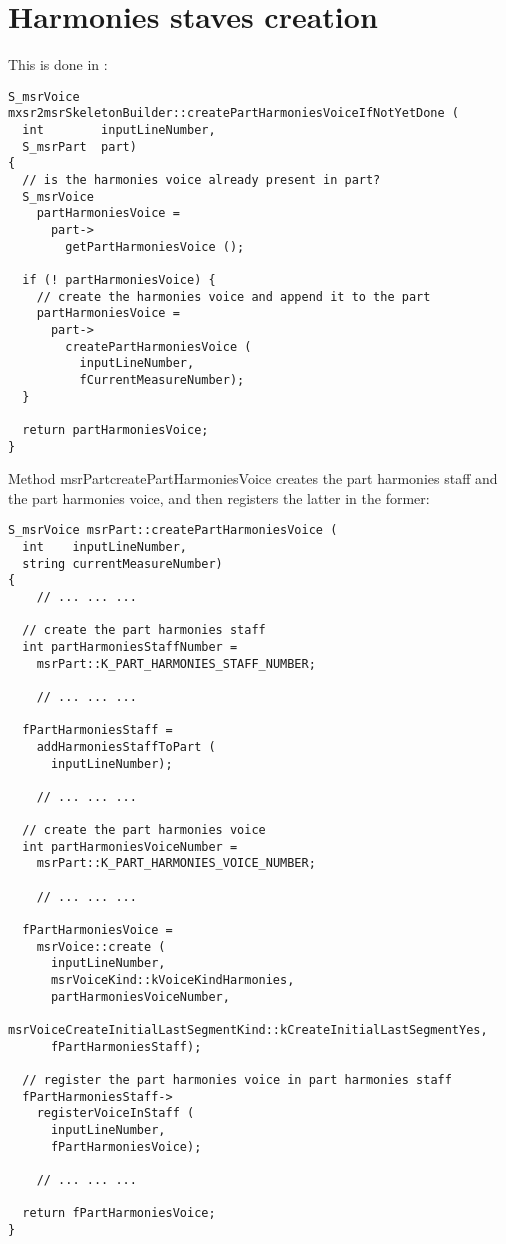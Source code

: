\section{Harmonies staves creation}

This is done in :
\begin{lstlisting}[language=CPlusPlus]
S_msrVoice mxsr2msrSkeletonBuilder::createPartHarmoniesVoiceIfNotYetDone (
  int        inputLineNumber,
  S_msrPart  part)
{
  // is the harmonies voice already present in part?
  S_msrVoice
    partHarmoniesVoice =
      part->
        getPartHarmoniesVoice ();

  if (! partHarmoniesVoice) {
    // create the harmonies voice and append it to the part
    partHarmoniesVoice =
      part->
        createPartHarmoniesVoice (
          inputLineNumber,
          fCurrentMeasureNumber);
  }

  return partHarmoniesVoice;
}
\end{lstlisting}

Method {msrPart}{createPartHarmoniesVoice} creates the part harmonies staff and the part harmonies voice, and then registers the latter in the former:
\begin{lstlisting}[language=CPlusPlus]
S_msrVoice msrPart::createPartHarmoniesVoice (
  int    inputLineNumber,
  string currentMeasureNumber)
{
	// ... ... ...

  // create the part harmonies staff
  int partHarmoniesStaffNumber =
    msrPart::K_PART_HARMONIES_STAFF_NUMBER;

	// ... ... ...

  fPartHarmoniesStaff =
    addHarmoniesStaffToPart (
      inputLineNumber);

	// ... ... ...

  // create the part harmonies voice
  int partHarmoniesVoiceNumber =
    msrPart::K_PART_HARMONIES_VOICE_NUMBER;

	// ... ... ...

  fPartHarmoniesVoice =
    msrVoice::create (
      inputLineNumber,
      msrVoiceKind::kVoiceKindHarmonies,
      partHarmoniesVoiceNumber,
      msrVoiceCreateInitialLastSegmentKind::kCreateInitialLastSegmentYes,
      fPartHarmoniesStaff);

  // register the part harmonies voice in part harmonies staff
  fPartHarmoniesStaff->
    registerVoiceInStaff (
      inputLineNumber,
      fPartHarmoniesVoice);

	// ... ... ...

  return fPartHarmoniesVoice;
}
\end{lstlisting}


